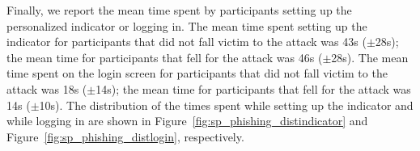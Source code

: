 Finally, we report the mean time spent by participants setting up the
personalized indicator or logging in. The mean time spent setting up the
indicator for participants that did not fall victim to the attack was 43s
($\pm$28s); the mean time for participants that fell for the attack was 46s
($\pm$28s). The mean time spent on the login screen for participants that did
not fall victim to the attack was 18s ($\pm$14s); the mean time for
participants that fell for the attack was 14s ($\pm$10s). The distribution of
the times spent while setting up the indicator and while logging in are shown
in Figure~\ref{fig:sp_phishing_distindicator} and Figure~\ref{fig:sp_phishing_distlogin}, respectively.



